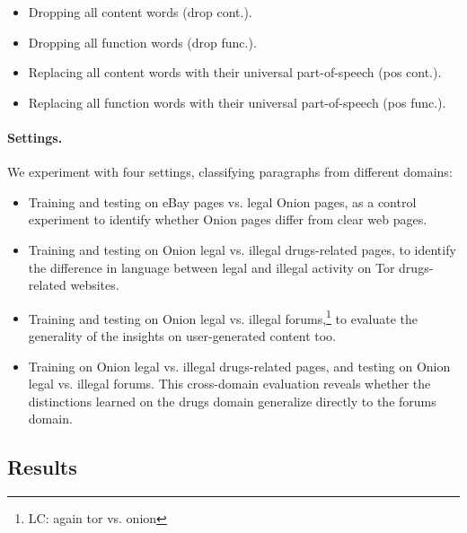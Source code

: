 \documentclass[11pt,a4paper,table]{article}
\newcommand{\lc}[1]{\footnote{\color{blue}LC: #1}}
\begin{document}
\begin{itemize}
  \item Dropping all content words (drop cont.).
  \item Dropping all function words (drop func.).
  \item Replacing all content words with their universal part-of-speech (pos cont.).
  \item Replacing all function words with their universal part-of-speech (pos func.).
\end{itemize}

\paragraph{Settings.}

We experiment with four settings, classifying paragraphs from different domains:
\begin{itemize}
  \item Training and testing on eBay pages vs. legal Onion pages,
  as a control experiment
  to identify whether Onion pages differ from clear web pages.
  \item Training and testing on Onion legal vs. illegal drugs-related pages,
  to identify the difference in language between legal and illegal activity
  on Tor drugs-related websites.
  \item Training and testing on Onion legal vs. illegal forums,\lc{again tor vs. onion}
  to evaluate the generality of the insights on user-generated content too.
  \item Training on Onion legal vs. illegal drugs-related pages,
  and testing on Onion legal vs. illegal forums.
  This cross-domain evaluation reveals whether the distinctions learned on the
  drugs domain generalize directly to the forums domain.
\end{itemize}

\subsection{Results}
\end{document}
